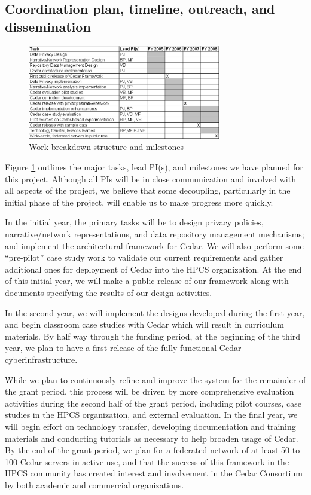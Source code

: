 \subsection{Coordination plan, timeline, outreach, and dissemination}


\begin{figure}[ht]
  \centering
  \includegraphics[width=0.75\textwidth]{workstructure.eps}
  \caption{Work breakdown structure and milestones}
  \label{fig:timeline}
\end{figure}

Figure \ref{fig:timeline} outlines the major tasks, lead PI(s), and
milestones we have planned for this project.  Although all PIs will be in
close communication and involved with all aspects of the project, we
believe that some decoupling, particularly in the initial phase of the
project, will enable us to make progress more quickly.  

In the initial year, the primary tasks will be to design privacy policies,
narrative/network representations, and data repository management
mechanisms; and implement the architectural framework for Cedar. We will
also perform some ``pre-pilot'' case study work to validate our current
requirements and gather additional ones for deployment of Cedar into the
HPCS organization.  At the end of this initial year, we will make a public
release of our framework along with documents specifying the results of our
design activities.

In the second year, we will implement the designs developed during the
first year, and begin classroom case studies with Cedar which will result
in curriculum materials.  By half way through the funding period, at the
beginning of the third year, we plan to have a first release of the fully
functional Cedar cyberinfrastructure.

While we plan to continuously refine and improve the system for the
remainder of the grant period, this process will be driven by more
comprehensive evaluation activities during the second half of the grant
period, including pilot courses, case studies in the HPCS organization, and
external evaluation.  In the final year, we will begin effort on technology
transfer, developing documentation and training materials and conducting
tutorials as necessary to help broaden usage of Cedar.  By the end of the
grant period, we plan for a federated network of at least 50 to 100 Cedar
servers in active use, and that the success of this framework in the HPCS
community has created interest and involvement in the Cedar Consortium by
both academic and commercial organizations.

